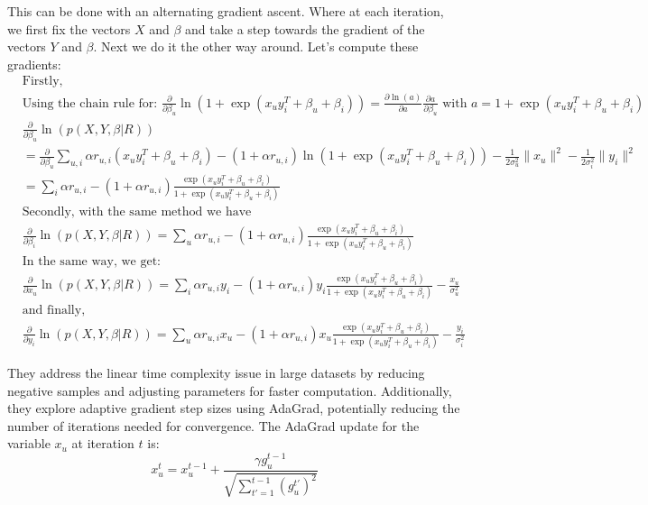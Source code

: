 This can be done with an alternating gradient ascent. Where at each iteration, we first fix the vectors $X$ and $\beta$ and take a step towards the gradient of the vectors $Y$ and $\beta$. Next we do it the other way around. Let's compute these gradients:
\begin{align*}
    &\text{Firstly, } \\
    &\text{Using the chain rule for: } \frac{\partial}{\partial \beta_u} \ln \left( 1 + \exp(x_u y_i^T + \beta_u + \beta_i) \right) = \frac{\partial \ln(a)}{\partial a} \frac{\partial a}{\partial \beta_u} \text{ with } a = 1 + \exp(x_u y_i^T + \beta_u + \beta_i) \\
    &\frac{\partial}{\partial \beta_u} \ln \left(p(X, Y, \beta | R) \right) \\
    &= \frac{\partial}{\partial \beta_u} \sum_{u,i} \alpha r_{u,i}(x_u y_i^T + \beta_u + \beta_i) - (1 + \alpha r_{u,i}) \ln \left(1 + \exp(x_u y_i^T + \beta_u + \beta_i) \right) - \frac{1}{2 \sigma_{u}^2} \|x_u\|^2 - \frac{1}{2 \sigma_{i}^2}  \|y_i\|^2 \\
    &= \sum_{i} \alpha r_{u,i} - (1 + \alpha r_{u,i}) \frac{\exp(x_u y_i^T + \beta_u + \beta_i)}{1 + \exp(x_u y_i^T + \beta_u + \beta_i)} \\
    &\text{Secondly, with the same method we have} \\
    &\frac{\partial}{\partial \beta_i} \ln \left(p(X, Y, \beta | R) \right)
    = \sum_{u} \alpha r_{u,i} - (1 + \alpha r_{u,i}) \frac{\exp(x_u y_i^T + \beta_u + \beta_i)}{1 + \exp(x_u y_i^T + \beta_u + \beta_i)} \\
    &\text{In the same way, we get: }\\
    &\frac{\partial}{\partial x_u} \ln \left(p(X, Y, \beta | R) \right)
    = \sum_{i} \alpha r_{u,i} y_i - (1 + \alpha r_{u,i}) y_i \frac{\exp(x_u y_i^T + \beta_u + \beta_i)}{1 + \exp(x_u y_i^T + \beta_u + \beta_i)} - \frac{x_u}{\sigma_u^2} \\
    &\text{and finally, } \\
    &\frac{\partial}{\partial y_i} \ln \left(p(X, Y, \beta | R) \right) 
    = \sum_{u} \alpha r_{u,i} x_u - (1 + \alpha r_{u,i}) x_u \frac{\exp(x_u y_i^T + \beta_u + \beta_i)}{1 + \exp(x_u y_i^T + \beta_u + \beta_i)} - \frac{y_i}{\sigma_i^2}
\end{align*}

They address the linear time complexity issue in large datasets by reducing negative samples and adjusting parameters for faster computation. Additionally, they explore adaptive gradient step sizes using AdaGrad, potentially reducing the number of iterations needed for convergence. The AdaGrad update for the variable $x_u$ at iteration $t$ is:
\[
x_u^t = x_u^{t-1} + \frac{\gamma g_u^{t-1}}{\sqrt{\sum_{t' = 1}^{t-1} (g_u^{t'})^2}}
\]

